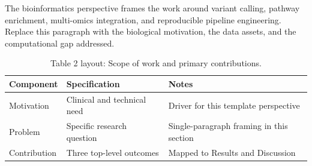 
The bioinformatics perspective frames the work around variant calling, pathway enrichment, multi-omics integration, and reproducible pipeline engineering. Replace this paragraph with the biological motivation, the data assets, and the computational gap addressed.

\begin{table}[H]
\caption{Table 2 layout: Scope of work and primary contributions.}
\label{tab:intro_overview}
\centering
\begin{tabular}{>{\raggedright\arraybackslash}p{3.4cm} >{\raggedright\arraybackslash}p{4.6cm} >{\raggedright\arraybackslash}p{5.4cm}}
\toprule
\textbf{Component} & \textbf{Specification} & \textbf{Notes} \\
\midrule
  Motivation & Clinical and technical need & Driver for this template perspective \\
  Problem & Specific research question & Single-paragraph framing in this section \\
  Contribution & Three top-level outcomes & Mapped to Results and Discussion \\
\bottomrule
\end{tabular}
\end{table}
